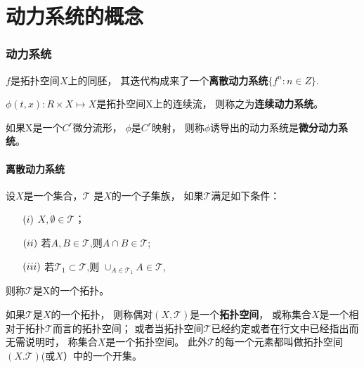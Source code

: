 \part{动力系统的概念}
\section{动力系统}

\begin{Defination}[离散动力系统]
\(f\)是拓扑空间\(X\)上的同胚，
其迭代构成来了一个\textbf{离散动力系统}\(\{f^n:n\in Z\}\).
\end{Defination}

\begin{Defination}[连续动力系统]
\(\phi(t,x):R\times X\mapsto X\)是拓扑空间X上的连续流，
则称之为\textbf{连续动力系统}。
\end{Defination}

\begin{Defination}[微分动力系统]
如果X是一个\(C^r\)微分流形，
\(\phi\)是\(C^r\)映射，
则称\(\phi\)诱导出的动力系统是\textbf{微分动力系统}。
\end{Defination}
\subsection{离散动力系统}

\begin{Defination}[拓扑空间]
设\(X\)是一个集合，\(\mathscr{T}\) 是\(X\)的一个子集族，
如果\(\mathscr{T}\)满足如下条件：
                \begin{enumerate}
                        \item [\((\romannumeral 1)\)]  \( X,\emptyset \in \mathscr{T}\)；
                        \item [\((\romannumeral 2)\)]  若\(A,B \in \mathscr{T}\),则\(A\cap B\in \mathscr{T}\);
                        \item [\((\romannumeral 3)\)]  若\(\mathscr{T}_1\subset \mathscr{T}\),则 \(\cup_{A \in \mathscr{T}_1}A\in \mathscr{T}\),
                \end{enumerate}
则称\(\mathscr{T}\)是X的一个拓扑。
\end{Defination}
如果\(\mathscr{T}\)是\(X\)的一个拓扑，
则称偶对\((X,\mathscr{T})\)是一个\textbf{拓扑空间}，
或称集合\(X\)是一个相对于拓扑\(\mathscr{T}\)而言的拓扑空间；
或者当拓扑空间\(\mathscr{T}\)已经约定或者在行文中已经指出而无需说明时，
称集合\(X\)是一个拓扑空间。
此外\(\mathscr{T}\)的每一个元素都叫做拓扑空间\((X.\mathscr{T})\)(或\(X\)）中的一个开集。

